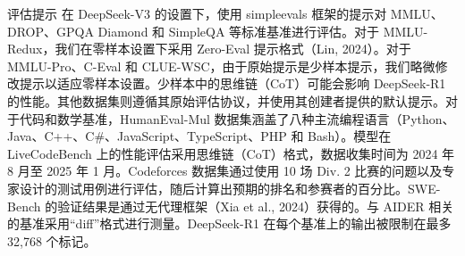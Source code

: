 \documentclass[12pt,a4paper]{report} %
\begin{document}
评估提示 在 DeepSeek-V3 的设置下，使用 simpleevals 框架的提示对 MMLU、DROP、GPQA Diamond 和 SimpleQA 等标准基准进行评估。对于 MMLU-Redux，我们在零样本设置下采用 Zero-Eval 提示格式（Lin, 2024）。对于 MMLU-Pro、C-Eval 和 CLUE-WSC，由于原始提示是少样本提示，我们略微修改提示以适应零样本设置。少样本中的思维链（CoT）可能会影响 DeepSeek-R1 的性能。其他数据集则遵循其原始评估协议，并使用其创建者提供的默认提示。对于代码和数学基准，HumanEval-Mul 数据集涵盖了八种主流编程语言（Python、Java、C++、C\#{}、JavaScript、TypeScript、PHP 和 Bash）。模型在 LiveCodeBench 上的性能评估采用思维链（CoT）格式，数据收集时间为 2024 年 8 月至 2025 年 1 月。Codeforces 数据集通过使用 10 场 Div. 2 比赛的问题以及专家设计的测试用例进行评估，随后计算出预期的排名和参赛者的百分比。SWE-Bench 的验证结果是通过无代理框架（Xia et al., 2024）获得的。与 AIDER 相关的基准采用“diff”格式进行测量。DeepSeek-R1 在每个基准上的输出被限制在最多 32,768 个标记。

\end{document}
